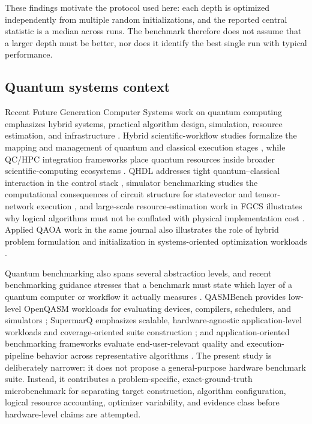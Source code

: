 \documentclass[5p,times]{elsarticle}
\begin{document}
These findings motivate the protocol used here: each depth is optimized independently from multiple random initializations, and the reported central statistic is a median across runs. The benchmark therefore does not assume that a larger depth must be better, nor does it identify the best single run with typical performance.

\subsection{Quantum systems context}
Recent Future Generation Computer Systems work on quantum computing emphasizes hybrid systems, practical algorithm design, simulation, resource estimation, and infrastructure \cite{markidis2026editorial}. Hybrid scientific-workflow studies formalize the mapping and management of quantum and classical execution stages \cite{cranganore2024}, while QC/HPC integration frameworks place quantum resources inside broader scientific-computing ecosystems \cite{beck2024}. QHDL addresses tight quantum--classical interaction in the control stack \cite{netzer2026}, simulator benchmarking studies the computational consequences of circuit structure for statevector and tensor-network execution \cite{vallero2026}, and large-scale resource-estimation work in FGCS illustrates why logical algorithms must not be conflated with physical implementation cost \cite{gheorghiu2025}. Applied QAOA work in the same journal also illustrates the role of hybrid problem formulation and initialization in systems-oriented optimization workloads \cite{tirado2026}.

Quantum benchmarking also spans several abstraction levels, and recent benchmarking guidance stresses that a benchmark must state which layer of a quantum computer or workflow it actually measures \cite{proctor2025benchmarking}. QASMBench provides low-level OpenQASM workloads for evaluating devices, compilers, schedulers, and simulators \cite{li2023qasmbench}; SupermarQ emphasizes scalable, hardware-agnostic application-level workloads and coverage-oriented suite construction \cite{tomesh2022supermarq}; and application-oriented benchmarking frameworks evaluate end-user-relevant quality and execution-pipeline behavior across representative algorithms \cite{lubinski2023application,lubinski2024exploration}. The present study is deliberately narrower: it does not propose a general-purpose hardware benchmark suite. Instead, it contributes a problem-specific, exact-ground-truth microbenchmark for separating target construction, algorithm configuration, logical resource accounting, optimizer variability, and evidence class before hardware-level claims are attempted.
\end{document}
